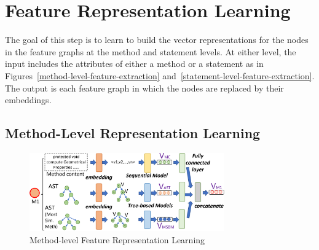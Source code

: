 \section{Feature Representation Learning}
\label{feature-learning:sec}

The goal of this step is to learn to build the vector representations
for the nodes in the feature graphs at the method and statement levels.
At either level, the input includes the attributes of either a method
or a statement as in Figures~\ref{method-level-feature-extraction}
and~\ref{statement-level-feature-extraction}. The output is each
feature graph in which the nodes are replaced by their embeddings.



\subsection{Method-Level Representation Learning}

\begin{figure}[t]
	\centering
	\includegraphics[width=3.3in]{graphs/step-2-method-new-2.png}
        \vspace{-8pt}
	\caption{Method-level Feature Representation Learning}
	\label{method-level-feature-learning}
\end{figure}



